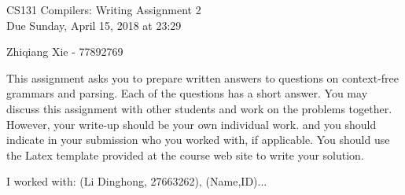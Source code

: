 \documentclass[10pt]{article}
\begin{document}
\begin{center}
\Large CS131 Compilers: Writing Assignment 2\\Due Sunday, April 15, 2018 at 23:29
\end{center}

\begin{center}
\LARGE Zhiqiang Xie - 77892769
\end{center}

This assignment asks you to prepare written answers to questions on
context-free grammars and parsing. Each of the questions has a short answer. You
may discuss this assignment with other students and work on the problems
together. However, your write-up should be your own individual work.
and you should indicate in your submission who you worked with, if applicable.
You should use the Latex template provided at the course web site to write your solution.

\begin{center}
I worked with: (Li Dinghong, 27663262), (Name,ID)...
\end{center}
\end{document}
